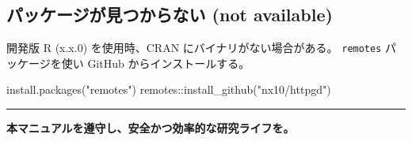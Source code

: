 \documentclass[
  pandoc]{bxjsarticle}
\newenvironment{Shaded}{\begin{snugshade}}{\end{snugshade}}
\newcommand{\FunctionTok}[1]{\textcolor[rgb]{0.28,0.35,0.67}{#1}}
\newcommand{\NormalTok}[1]{\textcolor[rgb]{0.00,0.23,0.31}{#1}}
\newcommand{\SpecialCharTok}[1]{\textcolor[rgb]{0.37,0.37,0.37}{#1}}
\newcommand{\StringTok}[1]{\textcolor[rgb]{0.13,0.47,0.30}{#1}}
\begin{document}
\subsection{パッケージが見つからない (not
available)}\label{ux30d1ux30c3ux30b1ux30fcux30b8ux304cux898bux3064ux304bux3089ux306aux3044-not-available}

開発版 R (x.x.0) を使用時、CRAN にバイナリがない場合がある。
\texttt{remotes} パッケージを使い GitHub からインストールする。

\begin{Shaded}
\begin{Highlighting}[]
\FunctionTok{install.packages}\NormalTok{(}\StringTok{"remotes"}\NormalTok{)}
\NormalTok{remotes}\SpecialCharTok{::}\FunctionTok{install\_github}\NormalTok{(}\StringTok{"nx10/httpgd"}\NormalTok{)}
\end{Highlighting}
\end{Shaded}

\begin{center}\rule{0.5\linewidth}{0.5pt}\end{center}

\textbf{本マニュアルを遵守し、安全かつ効率的な研究ライフを。}
\end{document}
